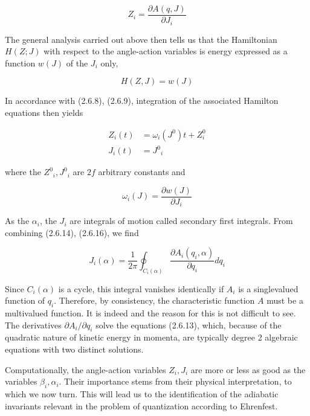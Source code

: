 \documentclass{article}
\begin{document}
\begin{equation*}
Z_{i}=\frac{\partial A(q, J)}{\partial J_{i}} \tag{2.6.18}
\end{equation*}
 

The general analysis carried out above then tells us that the Hamiltonian $H(Z ; J)$ with respect to the angle-action variables is energy expressed as a function $w(J)$ of the $J_{i}$ only,
 
\begin{equation*}
H(Z, J)=w(J) \tag{2.6.19}
\end{equation*}
 

In accordance with (2.6.8), (2.6.9), integration of the associated Hamilton equations then yields
 
\begin{align*}
Z_{i}(t) & =\omega_{i}\left(J^{0}\right) t+Z_{i}^{0}  \tag{2.6.20a}\\
J_{i}(t) & ={J^{0}}_{i} \tag{2.6.20b}
\end{align*}
 
where the $Z^{0}{ }_{i}, J^{0}{ }_{i}$ are $2 f$ arbitrary constants and
 
\begin{equation*}
\omega_{i}(J)=\frac{\partial w(J)}{\partial J_{i}} \tag{2.6.21}
\end{equation*}
 

As the $\alpha_{i}$, the $J_{i}$ are integrals of motion called secondary first integrals.
From combining (2.6.14), (2.6.16), we find
 
\begin{equation*}
J_{i}(\alpha)=\frac{1}{2 \pi} \oint_{C_{i}(\alpha)} \frac{\partial A_{i}\left(q_{i}, \alpha\right)}{\partial q_{i}} d q_{i} \tag{2.6.22}
\end{equation*}
 

Since $C_{i}(\alpha)$ is a cycle, this integral vanishes identically if $A_{i}$ is a singlevalued function of $q_{i}$. Therefore, by consistency, the characteristic function $A$ must be a multivalued function. It is indeed and the reason for this is not difficult to see. The derivatives $\partial A_{i} / \partial q_{i}$ solve the equations (2.6.13), which, because of the quadratic nature of kinetic energy in momenta, are typically degree 2 algebraic equations with two distinct solutions.

Computationally, the angle-action variables $Z_{i}, J_{i}$ are more or less as good as the variables $\beta_{i}, \alpha_{i}$. Their importance stems from their physical interpretation, to which we now turn. This will lead us to the identification of the adiabatic invariants relevant in the problem of quantization according to Ehrenfest.
\end{document}
